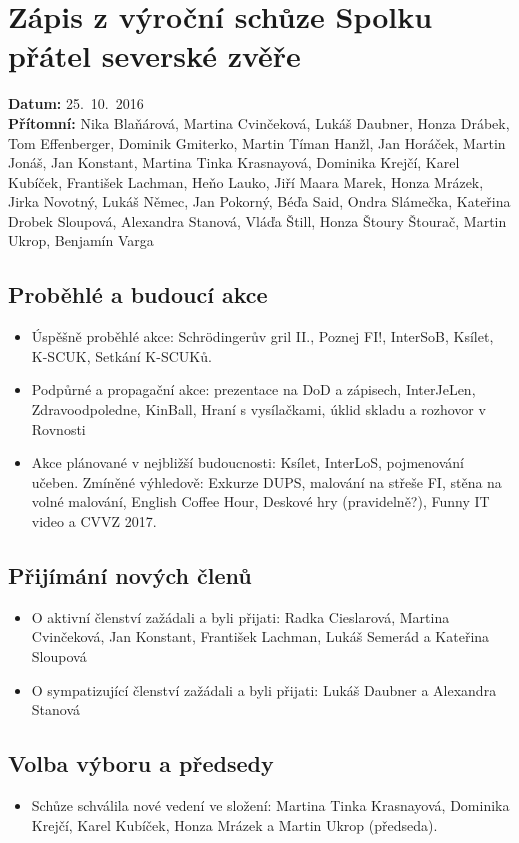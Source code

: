 \documentclass[11pt,a4paper]{article}
\begin{document}
\section*{Zápis z výroční schůze Spolku přátel severské zvěře}
\textbf{Datum:} 25.~10.~2016\\
\textbf{Přítomní:} Nika Blaňárová, Martina Cvinčeková, Lukáš Daubner, Honza Drábek, Tom Effenberger, Dominik Gmiterko, Martin Tíman Hanžl, Jan Horáček, Martin Jonáš, Jan Konstant, Martina Tinka Krasnayová, Dominika Krejčí, Karel Kubíček, František Lachman, Heňo Lauko, Jiří Maara Marek, Honza Mrázek, Jirka Novotný, Lukáš Němec, Jan Pokorný, Béďa Said, Ondra Slámečka, Kateřina Drobek Sloupová, Alexandra Stanová, Vláďa Štill, Honza Štoury Štourač, Martin Ukrop, Benjamín Varga

\subsection*{Proběhlé a budoucí akce}
\begin{itemize}[itemsep=0pt]
\item Úspěšně proběhlé akce: Schrödingerův gril II., Poznej FI!, InterSoB, Ksílet, K-SCUK, Setkání K-SCUKů.
\item Podpůrné a propagační akce: prezentace na DoD a zápisech, InterJeLen, Zdravoodpoledne, KinBall, Hraní s vysílačkami, úklid skladu a rozhovor v Rovnosti
\item Akce plánované v nejbližší budoucnosti: Ksílet, InterLoS, pojmenování učeben. Zmíněné výhledově: Exkurze DUPS, malování na střeše FI, stěna na volné malování, English Coffee Hour, Deskové hry (pravidelně?), Funny IT video a CVVZ 2017.
\end{itemize}

\subsection*{Přijímání nových členů}
\begin{itemize}[itemsep=0pt]
\item O aktivní členství zažádali a byli přijati: Radka Cieslarová, Martina Cvinčeková, Jan Konstant, František Lachman, Lukáš Semerád a Kateřina Sloupová
\item O sympatizující členství zažádali a byli přijati: Lukáš Daubner a Alexandra Stanová
\end{itemize}

\subsection*{Volba výboru a předsedy}
\begin{itemize}[itemsep=0pt]
\item Schůze schválila nové vedení ve složení: Martina Tinka Krasnayová, Dominika Krejčí, Karel Kubíček, Honza Mrázek a Martin Ukrop (předseda).
\end{itemize}
\end{document}
